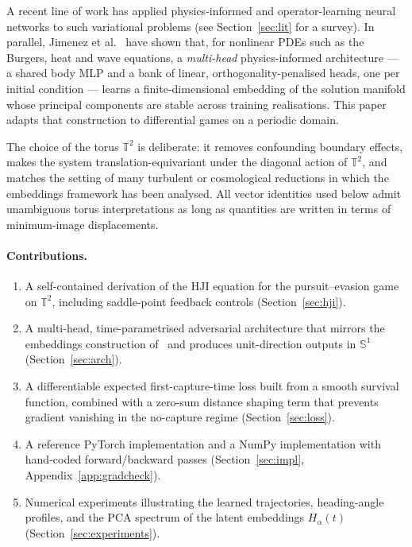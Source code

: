 \documentclass[11pt]{article}
\newcommand{\TT}{\mathbb{T}^{2}}
\begin{document}
A recent line of work has applied physics-informed and operator-learning
neural networks to such variational problems
(see Section~\ref{sec:lit} for a survey).  In parallel, Jimenez et al.\
\citep{JimenezEmbeddings2026} have shown that, for nonlinear PDEs such
as the Burgers, heat and wave equations, a \emph{multi-head}
physics-informed architecture --- a shared body MLP and a bank of
linear, orthogonality-penalised heads, one per initial condition ---
learns a finite-dimensional embedding of the solution manifold whose
principal components are stable across training realisations.
This paper adapts that construction to differential games on a periodic
domain.

The choice of the torus $\TT$ is deliberate: it removes confounding
boundary effects, makes the system translation-equivariant under the
diagonal action of $\TT$, and matches the setting of many turbulent or
cosmological reductions in which the embeddings framework has been
analysed.  All vector identities used below admit unambiguous
torus interpretations as long as quantities are written in terms of
minimum-image displacements.

\paragraph{Contributions.}
\begin{enumerate}
\item A self-contained derivation of the HJI equation for the
      pursuit--evasion game on $\TT$, including saddle-point feedback
      controls (Section~\ref{sec:hji}).
\item A multi-head, time-parametrised adversarial architecture that
      mirrors the embeddings construction of~\citep{JimenezEmbeddings2026}
      and produces unit-direction outputs in $\mathbb{S}^1$
      (Section~\ref{sec:arch}).
\item A differentiable expected first-capture-time loss built from a
      smooth survival function, combined with a zero-sum distance
      shaping term that prevents gradient vanishing in the no-capture
      regime (Section~\ref{sec:loss}).
\item A reference PyTorch implementation and a NumPy implementation with
      hand-coded forward/backward passes (Section~\ref{sec:impl},
      Appendix~\ref{app:gradcheck}).
\item Numerical experiments illustrating the learned trajectories,
      heading-angle profiles, and the PCA spectrum of the latent
      embeddings $H_\alpha(t)$ (Section~\ref{sec:experiments}).
\end{enumerate}
\end{document}
